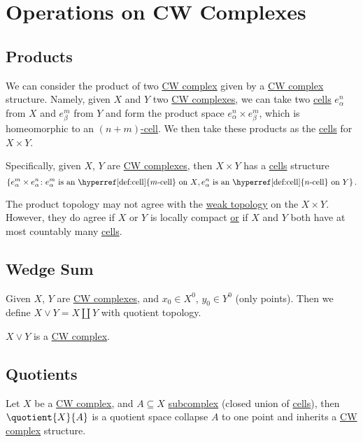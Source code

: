 \section{Operations on CW Complexes}
\subsection{Products}\label{CW-complex-product}
We can consider the product of two \hyperref[def:CW-Complex]{CW complex} given by a \hyperref[def:CW-Complex]{CW complex} structure. Namely, given \(X\) and \(Y\) two \hyperref[def:CW-Complex]{CW complexes}, we can take two \hyperref[def:cell]{cells} \(e^n_{\alpha }\) from \(X\) and \(e^m_{\beta }\) from \(Y\) and form the product space \(e^n_{\alpha }\times e^m_{\beta }\), which is homeomorphic to an \hyperref[def:cell]{\((n+m)\)-cell}. We then take these products as the \hyperref[def:cell]{cells} for \(X\times Y\).

Specifically, given \(X\), \(Y\) are \hyperref[def:CW-Complex]{CW complexes}, then \(X\times Y\) has a \hyperref[def:cell]{cells} structure
\[
	\left\{e_{\alpha}^m \times e_{\alpha}^n\colon e^m_{\alpha}\text{ is an \hyperref[def:cell]{\(m\)-cell} on \(X\)}, e^n_{\alpha}\text{ is an \hyperref[def:cell]{\(n\)-cell} on \(Y\)}\right\}.
\]
\begin{remark}
	The product topology may not agree with the \hyperref[def:weak-topology]{weak topology} on the \(X\times Y\). However, they do agree if \(X\) or \(Y\) is locally compact \underline{or} if \(X\) and \(Y\) both have at most countably many \hyperref[def:cell]{cells}.
\end{remark}

\subsection{Wedge Sum}\label{CW-complex-wedge-sum}
Given \(X\), \(Y\) are \hyperref[def:CW-Complex]{CW complexes}, and \(x_0\in X^0\), \(y_0\in Y^0\) (only points). Then we define \(X\vee Y = X\coprod Y\) with quotient topology.

\begin{remark}
	\(X\lor Y\) is a \hyperref[def:CW-Complex]{CW complex}.
\end{remark}

\subsection{Quotients}\label{CW-complex-quotient}
Let \(X\) be a \hyperref[def:CW-Complex]{CW complex}, and \(A\subseteq X\) \hyperref[def:CW-subcomplex]{subcomplex} (closed union of \hyperref[def:cell]{cells}), then \(\quotient{X}{A}\) is a quotient space collapse \(A\) to one point and inherits a \hyperref[def:CW-Complex]{CW complex} structure.

